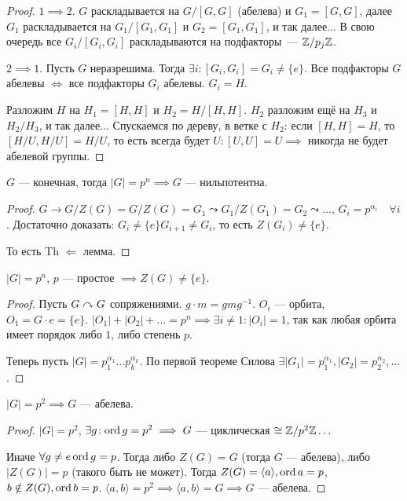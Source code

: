 \begin{proof}
    $1 \implies 2$. $G$ раскладывается на $G / [G, G]$ (абелева) и $G_1 = [G, G]$, далее $G_1$ раскладывается на $G_1 / [G_1, G_1]$ и $G_2 = [G_1, G_1]$, и так далее... В свою очередь все $G_i / [G_i, G_i]$ раскладываются на подфакторы~--- $\mathbb{Z} / p_j \mathbb{Z}$.

    $2 \implies 1$. Пусть $G$ неразрешима. Тогда  $\exists i\!: [G_i, G_i] = G_i \neq \{e\}$. Все подфакторы  $G$ абелевы  $\iff$ все подфакторы  $G_i$ абелевы.  $G_i = H$.

    Разложим  $H$ на $H_1 = [H, H]$ и $H_2 = H / [H, H]$. $H_2$ разложим ещё на $H_3$ и $H_2 / H_3$, и так далее... Спускаемся по дереву, в ветке с $H_2$: если $[H, H] = H$, то $[H / U, H / U] = H / U$, то есть всегда будет $U: [U, U] = U \implies$ никогда не будет абелевой группы.
\end{proof}
\begin{theorem}
    $G$ --- конечная, тогда  $|G| = p^n \implies G$ --- нильпотентна.
\end{theorem}
\begin{proof}
    $G \to G / Z(G) = G / Z(G) = G_1 \leadsto G_1 / Z(G_1) = G_2 \leadsto \ldots$, $G_i = p^{\alpha_i} \quad \forall i$. Достаточно доказать:  $G_i \neq \{e\} G_{i+1} \neq G_i$, то есть  $Z(G_i) \neq \{e\}$.

    То есть  Th  $\Leftarrow$  лемма.
\end{proof}
\begin{lemma}
    $|G| = p^n$,  $p$ --- простое  $\implies Z(G) \neq \{e\}$.
\end{lemma}
\begin{proof}
    Пусть $G \curvearrowright G$ сопряжениями. $g \cdot m = g m g^{-1}$.   $O_i$ --- орбита,  $O_1 = G \cdot e = \{e\}$.  $|O_1| + |O_2| + \ldots = p^n \implies \exists i \neq 1\!: |O_i| = 1$, так как любая орбита имеет порядок либо $1$, либо степень $p$.

    Теперь пусть $|G| = p_1^{\alpha_1} \ldots p_k^{\alpha_k}$. По первой теореме Силова $\exists |G_1| = p_1^{\alpha_1}, |G_2| = p_2^{\alpha_2}, \ldots$.
\end{proof}
\begin{theorem}
    $|G| = p^2 \implies G$ --- абелева.
\end{theorem}
\begin{proof}
    $|G| = p^2$,  $\exists g\!: \operatorname{ord} g =p^2 \implies G$ --- циклическая  $\cong \mathbb{Z} / p^2 \mathbb{Z} \ldots$

    Иначе $\forall g \neq e \operatorname{ord} g = p$.  Тогда либо $Z(G) = G$ (тогда $G$ --- абелева), либо $|Z(G)| = p$ (такого быть не может). Тогда  $Z(G) = \langle a \rangle, \operatorname{ord} a = p$,  $b \notin Z(G), \operatorname{ord} b = p$.  $\langle a, b\rangle = p^2 \implies \langle a, b \rangle = G \implies G$ --- абелева.
\end{proof}

